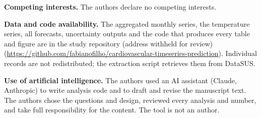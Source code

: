 \textbf{Competing interests.} The authors declare no competing interests.

\textbf{Data and code availability.} The aggregated monthly series, the temperature series,
all forecasts, uncertainty outputs and the code that produces every table and figure are in
the study repository
\ifdefined\BLIND(address withheld for review)\else
(\url{https://github.com/fabianofilho/cardiovascular-timeseries-prediction})\fi. Individual
records are not redistributed; the extraction script retrieves them from DataSUS.

\textbf{Use of artificial intelligence.} The authors used an AI assistant (Claude,
Anthropic) to write analysis code and to draft and revise the manuscript text. The authors
chose the questions and design, reviewed every analysis and number, and take full
responsibility for the content. The tool is not an author.








